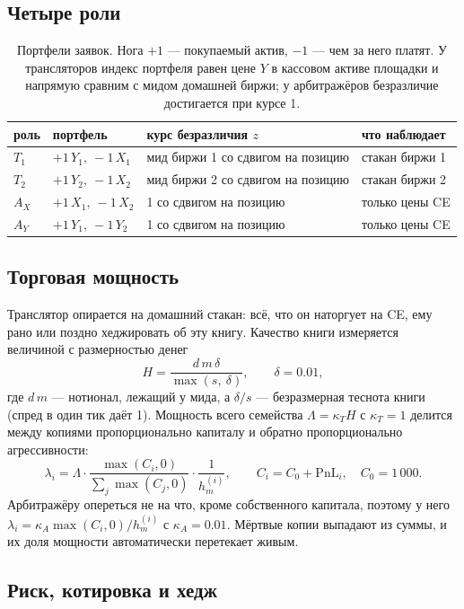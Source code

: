 \documentclass[11pt,a4paper]{article}
\begin{document}
\subsection{Четыре роли}

\begin{table}[H]
\centering
\caption{Портфели заявок. Нога \(+1\) --- покупаемый актив, \(-1\) --- чем
за него платят. У трансляторов индекс портфеля равен цене \(Y\) в кассовом
активе площадки и напрямую сравним с мидом домашней биржи; у арбитражёров
безразличие достигается при курсе 1.}
\small
\begin{tabular}{llll}
\toprule
роль & портфель & курс безразличия \(z\) & что наблюдает \\
\midrule
\(T_1\) & \(+1\,Y_1,\ -1\,X_1\) & мид биржи 1 со сдвигом на позицию
  & стакан биржи 1 \\
\(T_2\) & \(+1\,Y_2,\ -1\,X_2\) & мид биржи 2 со сдвигом на позицию
  & стакан биржи 2 \\
\(A_X\) & \(+1\,X_1,\ -1\,X_2\) & 1 со сдвигом на позицию
  & только цены CE \\
\(A_Y\) & \(+1\,Y_1,\ -1\,Y_2\) & 1 со сдвигом на позицию
  & только цены CE \\
\bottomrule
\end{tabular}
\end{table}

\subsection{Торговая мощность}

Транслятор опирается на домашний стакан: всё, что он наторгует на CE, ему
рано или поздно хеджировать об эту книгу. Качество книги измеряется
величиной с размерностью денег
\[
  H = \frac{d\, m\, \delta}{\max(s,\ \delta)},\qquad \delta = 0.01,
\]
где \(d\,m\) --- нотионал, лежащий у мида, а \(\delta/s\) --- безразмерная
теснота книги (спред в один тик даёт 1). Мощность всего семейства
\(\Lambda = \kappa_T H\) с \(\kappa_T = 1\) делится между копиями
пропорционально капиталу и обратно пропорционально агрессивности:
\[
  \lambda_i = \Lambda \cdot \frac{\max(C_i,0)}{\sum_j \max(C_j,0)}
              \cdot \frac{1}{h_m^{(i)}},\qquad
  C_i = C_0 + \mathrm{PnL}_i,\quad C_0 = 1\,000 .
\]
Арбитражёру опереться не на что, кроме собственного капитала, поэтому у него
\(\lambda_i = \kappa_A \max(C_i,0)/h_m^{(i)}\) с \(\kappa_A = 0.01\).
Мёртвые копии выпадают из суммы, и их доля мощности автоматически перетекает
живым.

\subsection{Риск, котировка и хедж}
\end{document}
